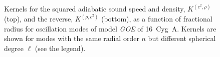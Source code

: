 \begin{figure}
    \centering
    \\
    \caption[$(c^2,\rho)$ kernels for 16~Cyg~A]{Kernels for the squared adiabatic sound speed and density, $K^{(c^2, \rho)}$ (top), and the reverse, $K^{(\rho, c^2)}$ (bottom), as a function of fractional radius for oscillation modes of model \emph{GOE} of 16~Cyg~A. Kernels are shown for modes with the same radial order $n$ but different spherical degree $\ell$ (see the legend). 
    \label{fig:c2-rho} }
\end{figure}


